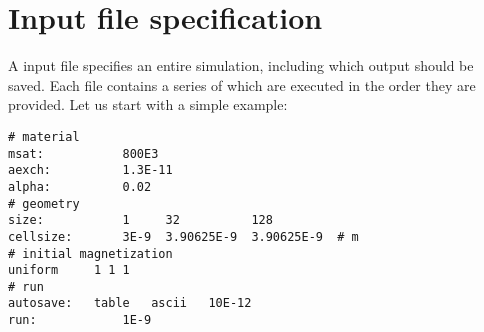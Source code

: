 \section{Input file specification}

A \prog input file specifies an entire simulation, including which output should be saved. Each file contains a series of  which are executed in the order they are provided. Let us start with a simple example:


\begin{verbatim}
# material
msat:       	800E3 
aexch:      	1.3E-11
alpha:      	0.02
# geometry 
size:       	1     32          128    
cellsize:   	3E-9  3.90625E-9  3.90625E-9  # m
# initial magnetization
uniform		1 1 1
# run
autosave:	table	ascii	10E-12
run:          	1E-9
\end{verbatim}
